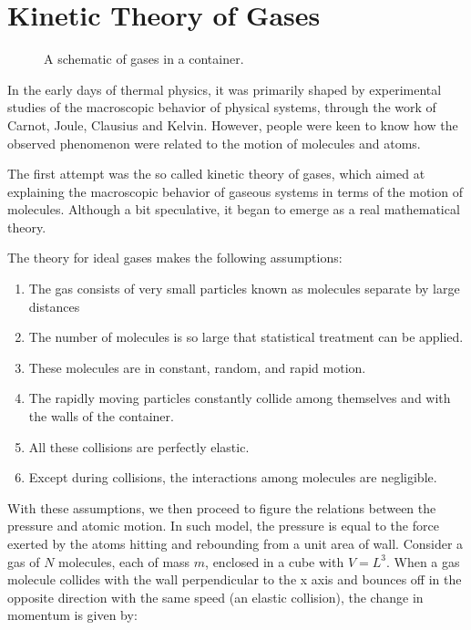 \section{Kinetic Theory of Gases}
\begin{figure}[h]
\centering
{}
\caption{A schematic of gases in a container.}
\end{figure}

In the early days of thermal physics, it was primarily shaped by experimental studies of the macroscopic behavior of physical systems, through the work of Carnot, Joule, Clausius and Kelvin. However, people were keen to know how the observed phenomenon were related to the motion of molecules and atoms.

The first attempt was the so called kinetic theory of gases, which aimed at explaining the macroscopic behavior of gaseous systems in terms of the motion of molecules. Although a bit speculative, it began to emerge as a real mathematical theory. 

The theory for ideal gases makes the following assumptions:
\begin{enumerate}
	\item The gas consists of very small particles known as molecules separate by large distances
	\item The number of molecules is so large that statistical treatment can be applied.
	\item These molecules are in constant, random, and rapid motion.
	\item The rapidly moving particles constantly collide among themselves and with the walls of the container. 
	\item All these collisions are perfectly elastic. 
	\item Except during collisions, the interactions among molecules are negligible. 
\end{enumerate}	
With these assumptions, we then proceed to figure the relations between the pressure and atomic motion. In such model, the pressure is equal to the force exerted by the atoms hitting and rebounding from a unit area of wall. Consider a gas of $N$ molecules, each of mass $m$, enclosed in a cube with $V = L^3$. When a gas molecule collides with the wall perpendicular to the x axis and bounces off in the opposite direction with the same speed (an elastic collision), the change in momentum is given by:


